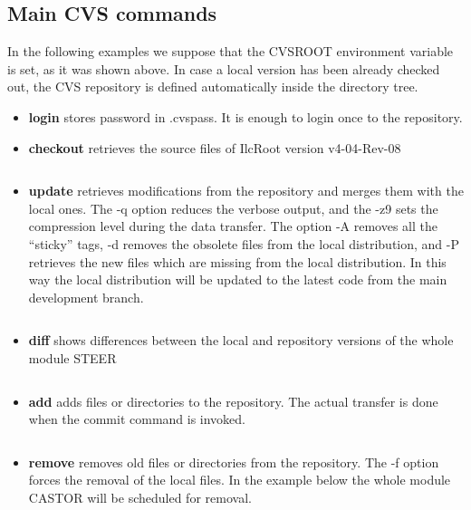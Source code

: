 \documentclass[12pt,a4paper,twoside]{article}
\begin{document}
\subsection{Main CVS commands}

In  the following  examples we  suppose that  the  CVSROOT environment
variable is  set, as it was shown  above. In case a  local version has
been already checked out,  the CVS repository is defined automatically
inside the directory tree.

\begin{itemize}
\item\textbf{login} stores password in .cvspass. It is enough to login
  once to the repository.

\item\textbf{checkout} retrieves the source files of IlcRoot version v4-04-Rev-08
  \begin{lstlisting}[language=sh]
    % cvs co -r v4-04-Rev-08 IlcRoot
  \end{lstlisting}

\item\textbf{update} retrieves  modifications from the  repository and
  merges them with  the local ones. The -q  option reduces the verbose
  output,  and the  -z9 sets  the  compression level  during the  data
  transfer. The option -A removes  all the ``sticky'' tags, -d removes
  the obsolete files from the local distribution, and -P retrieves the
  new files which are missing from the local distribution. In this way
  the local distribution  will be updated to the  latest code from the
  main development branch.
  \begin{lstlisting}[language=sh]
    % cvs -qz9 update -AdP STEER
  \end{lstlisting}

\item\textbf{diff} shows differences between the local and repository
  versions of the whole module STEER
  \begin{lstlisting}[language=sh]
    % cvs -qz9 diff STEER
  \end{lstlisting}

\item \textbf{add} adds files or directories to the repository. The
  actual transfer is done when the commit command is invoked.
  \begin{lstlisting}[language=sh]
    % cvs -qz9 add IlcTPCseed.*
  \end{lstlisting}

\item\textbf{remove}  removes  old   files  or  directories  from  the
  repository. The -f option forces  the removal of the local files. In
  the  example below  the whole  module CASTOR  will be  scheduled for
  removal.
  \begin{lstlisting}[language=sh]
    % cvs remove -f CASTOR
  \end{lstlisting}


\end{itemize}
\end{document}

